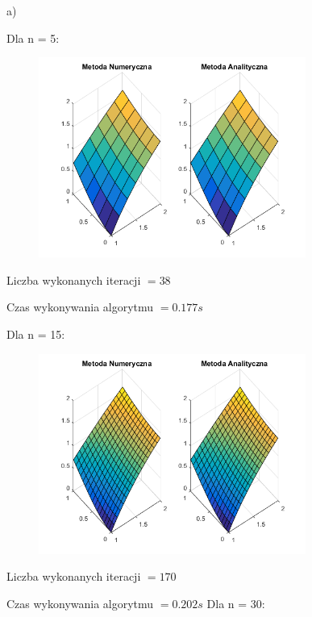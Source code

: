 a)

Dla n = 5:

\begin{figure}[!ht]
	\begin{center}
		\includegraphics[width=0.78\textwidth]{Lab6/charts/jacobi/zad1/5.png}
	\end{center}
\end{figure}

Liczba wykonanych iteracji $ = 38 $

Czas wykonywania algorytmu $ = 0.177 s$


Dla n = 15:

\begin{figure}[!ht]
	\begin{center}
		\includegraphics[width=0.78\textwidth]{Lab6/charts/jacobi/zad1/15.png}
	\end{center}
\end{figure}


Liczba wykonanych iteracji $ = 170 $

Czas wykonywania algorytmu $ = 0.202 s$
\newpage
Dla n = 30:

